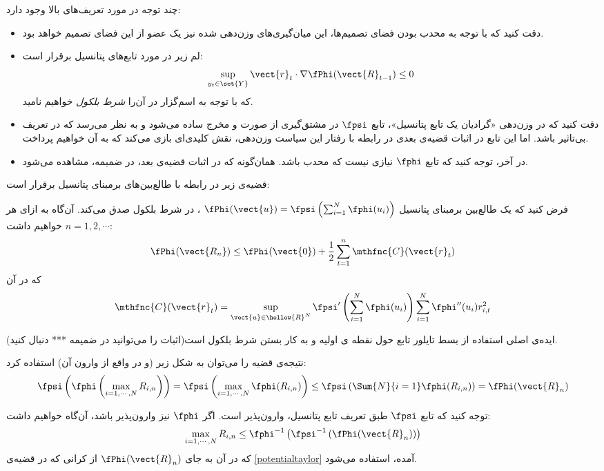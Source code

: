 چند توجه در مورد تعریف‌های بالا وجود دارد:
\begin{itemize}
\item 
دقت کنید که با توجه به محدب بودن فضای تصمیم‌ها، این میان‌گیری‌های وزن‌دهی شده نیز یک عضو از این فضای تصمیم خواهد بود.
\item 
لم زیر در مورد تابع‌های پتانسیل برقرار است:
\[
\sup_{y_t \in \set{Y}} \vect{r}_t \cdot \nabla \fPhi( \vect{R}_{t-1} ) \leq 0
\]
که با توجه به اسم‌گزار در 
\cite{asdsda} 
آن‌را 
\textit{
شرط بلکول
} 
خواهیم نامید.

\item 
دقت کنید که در وزن‌دهی «گرادیان یک تابع پتانسیل»، تابع 
$\fpsi$ 
در مشتق‌گیری از صورت و مخرج ساده می‌شود و به نظر می‌رسد که در تعریف بی‌تاثیر باشد. اما این تابع در اثبات قضیه‌ی بعدی در رابطه با رفتار این سیاست وزن‌دهی، نقش کلیدی‌ای بازی می‌کند که به آن خواهیم پرداخت.

\item 
در آخر، توجه کنید که تابع 
$\fphi$ 
نیازی نیست که محدب باشد. همان‌گونه که در اثبات قضیه‌ی بعد، در ضمیمه، مشاهده می‌شود.
\end{itemize}

قضیه‌ی زیر در رابطه با طالع‌بین‌های برمبنای پتانسیل برقرار است:
\begin{theorem}
\label{potentialtaylor}
فرض کنید که یک طالع‌بین برمبنای پتانسیل 
$\fPhi( \vect{u} ) = \fpsi \left( \sum^{N}_{i=1} \fphi( u_i ) \right)$
، در شرط بلکول صدق می‌کند. آن‌گاه به ازای هر 
$n = 1,2, \cdots$ 
خواهیم داشت:
\[
\fPhi( \vect{R_n} ) \leq \fPhi( \vect{0} ) + \frac{1}{2} \sum^{n}_{t=1} \mthfnc{C}( \vect{r}_t )
\]
که در آن
\[
\mthfnc{C}( \vect{r}_t ) = \sup_{ \vect{u} \in \hollow{R}^N } \fpsi^\prime \left( \sum^{N}_{i=1} \fphi( u_i ) \right) \sum^{N}_{i=1} \fphi^{\prime\prime} (u_i) r^{2}_{i,t}
\]
\end{theorem}

ایده‌ی اصلی استفاده از بسط تایلور تابع حول نقطه ی اولیه و به کار بستن شرط بلکول است(اثبات را می‌توانید در ضمیمه *** دنبال کنید).

نتیجه‌ی قضیه را می‌توان به شکل زیر (و در واقع از وارون آن) استفاده کرد:
\[
\fpsi \left( \fphi \left( \max_{i=1,\cdots,N} R_{i,n} \right) \right) = \fpsi \left( \max_{i=1,\cdots,N} \fphi (R_{i,n}) \right) \leq \fpsi \left( \Sum{N}{i=1} \fphi (R_{i,n}) \right) = \fPhi( \vect{R}_n )
\]

توجه کنید که تابع 
$\fpsi$ 
طبق تعریف تابع پتانسیل، وارون‌پذیر است. اگر 
$\fphi$ 
نیز وارون‌پذیر باشد، آن‌گاه خواهیم داشت:
\[
\max_{i=1,\cdots,N} R_{i,n} \leq \fphi^{-1} \left( \fpsi^{-1} \left( \fPhi( \vect{R}_n ) \right) \right)
\]
که در آن به جای 
$\fPhi (\vect{R}_n)$ 
از کرانی که در قضیه‌ی 
\ref{potentialtaylor} 
آمده، استفاده می‌شود.

